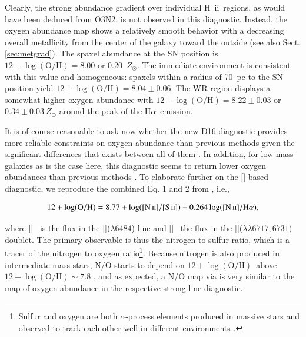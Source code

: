 \documentclass[traditabstract]{aa}
\newcommand{\ha}{H$\alpha$}
\newcommand{\hii}{\mbox{H~{\sc ii}}}
\newcommand{\oh}{12+\log(\mathrm{O/H})}
\newcommand{\sii}{[\ion{S}{ii}]}
\newcommand{\nii}{[\ion{N}{ii}]}
\begin{document}
Clearly, the strong abundance gradient over individual \hii\  regions, as would have been deduced from O3N2, is not observed in this diagnostic. Instead, the oxygen abundance map shows a relatively smooth behavior with a decreasing overall metallicity from the center of the galaxy toward the outside (see also Sect. \ref{sec:metgrad}). The spaxel abundance at the SN position is $\oh=8.00$ or 0.20~$Z_{\odot}$. The immediate environment is consistent with this value and homogeneous: spaxels within a radius of 70~pc to the SN position yield $\oh = 8.04\pm 0.06$. The WR region displays a somewhat higher oxygen abundance with $\oh=8.22\pm 0.03$ or $0.34\pm0.03~Z_{\odot}$ around the peak of the \ha~emission.

It is of course reasonable to ask now whether the new D16 diagnostic provides more reliable constraints on oxygen abundance than previous methods given the significant differences that exists between all of them \citep{2016arXiv161108595B}. In addition, for low-mass galaxies as is the case here, this diagnostic seems to return lower oxygen abundances than previous methods \citep{2016ApJ...823L..24K}. To elaborate further on the \sii-based diagnostic, we reproduce the combined Eq. 1 and 2 from \citet{2016Ap&SS.361...61D}, i.e.,

\begin{equation}
\label{eq:s2}
12+\log(\mathrm{O/H}) = 8.77 + \log([\ion{N}{ii}]/[\ion{S}{ii}]) + 0.264\log([]/\mathrm{H}\alpha)
,\end{equation}

where \nii~ is the flux in the \nii($\lambda6484$) line and \sii~ the flux in the \sii($\lambda\lambda6717,6731$) doublet. The primary observable is thus the nitrogen to sulfur ratio, which is a tracer of the nitrogen to oxygen ratio\footnote{Sulfur and oxygen are both $\alpha$-process elements produced in massive stars and observed to track each other well in different environments \citep[see, e.g., Fig. 6 in][]{2006A&A...448..955I}.}. Because nitrogen is also produced in intermediate-mass stars, N/O starts to depend on $\oh$~above $\oh\sim 7.8$ \citep[e.g.,][]{1999ApJ...511..639I, 2013A&A...549A..25P, 2016A&A...595A..62P}, and as expected, a N/O map via \citet{2010ApJ...715L.128A} is very similar to the map of oxygen abundance in the respective strong-line diagnostic.
\end{document}
